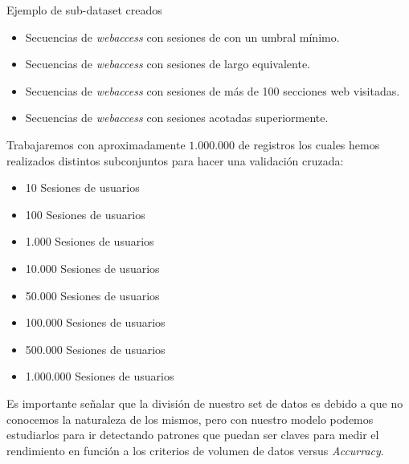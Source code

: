 Ejemplo de sub-dataset creados
\begin{itemize}
	\setlength{\itemsep}{0.9pt}
	\setlength{\parskip}{0pt}
	\setlength{\parsep}{0pt}
	\item Secuencias de \emph{webaccess} con sesiones de con un umbral mínimo.
	\item Secuencias de \emph{webaccess} con sesiones de largo equivalente.
	\item Secuencias de \emph{webaccess} con sesiones de más de 100 secciones web visitadas.
	\item Secuencias de \emph{webaccess} con sesiones acotadas superiormente.
\end{itemize}


Trabajaremos con aproximadamente $1.000.000$ de registros los cuales hemos realizados distintos subconjuntos para hacer una validación cruzada:

\begin{itemize}
	\setlength{\itemsep}{1pt}
	\setlength{\parskip}{0pt}
	\setlength{\parsep}{0pt}
	\item 10 Sesiones de usuarios
	\item 100 Sesiones de usuarios
	\item 1.000 Sesiones de usuarios
	\item 10.000 Sesiones de usuarios
	\item 50.000 Sesiones de usuarios
	\item 100.000 Sesiones de usuarios
	\item 500.000 Sesiones de usuarios
	\item 1.000.000 Sesiones de usuarios
\end{itemize}


Es importante señalar que la división de nuestro set de datos es debido a que no conocemos la naturaleza de los mismos, pero con nuestro modelo podemos estudiarlos para ir detectando patrones que puedan ser claves para medir el rendimiento en función a los criterios de volumen de datos versus \emph{Accurracy}.







